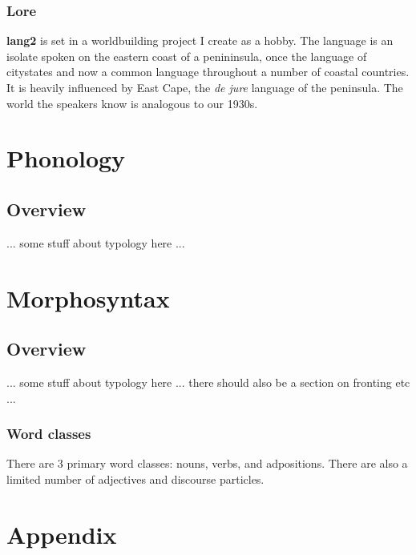 \documentclass[fontsize=12pt,twoside=false,numbers=noenddot]{kaobook}
\newcommand{\langname}{\textbf{lang2}}
\newcommand{\chaptertoc}[1]{\setchapterpreamble[u]{\margintoc}\chapter{#1}}
\begin{document}
\section{Lore}
\langname{} is set in a worldbuilding project I create as a hobby. The language is an isolate spoken on the eastern coast of a penininsula, once the language of citystates and now a common language throughout a number of coastal countries. It is heavily influenced by East Cape, the \textit{de jure} language of the peninsula. The world the speakers know is analogous to our 1930s.

\mainmatter %

\part{Phonology}

\chaptertoc{Overview}
... some stuff about typology here ...



\part{Morphosyntax}

\chaptertoc{Overview}
... some stuff about typology here ... there should also be a section on fronting etc ...

\section{Word classes}
There are 3 primary word classes: nouns, verbs, and adpositions. There are also a limited number of adjectives and discourse particles.










\part{Appendix}

\appendix %



\backmatter %

\end{document}
